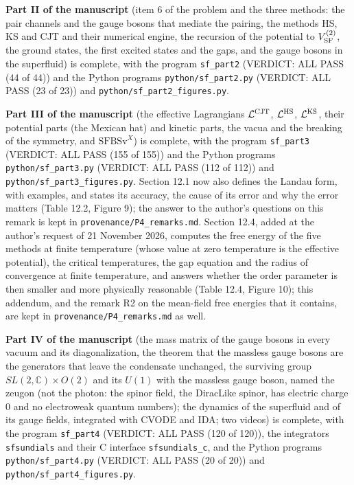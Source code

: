 \documentclass[
  10pt,
]{article}
\begin{document}
\textbf{Part II of the manuscript} (item 6 of the problem and the three
methods: the pair channels and the gauge bosons that mediate the
pairing, the methods HS, KS and CJT and their numerical engine, the
recursion of the potential to \(V^{(2)}_{\rm SF}\), the ground states,
the first excited states and the gaps, and the gauge bosons in the
superfluid) is complete, with the program \texttt{sf\_part2} (VERDICT:
ALL PASS (44 of 44)) and the Python programs
\texttt{python/sf\_part2.py} (VERDICT: ALL PASS (23 of 23)) and
\texttt{python/sf\_part2\_figures.py}.

\textbf{Part III of the manuscript} (the effective Lagrangians
\(\mathcal L^{\rm CJT}\), \(\mathcal L^{\rm HS}\),
\(\mathcal L^{\rm KS}\), their potential parts (the Mexican hat) and
kinetic parts, the vacua and the breaking of the symmetry, and
\(\mathrm{SFBSv}^X\)) is complete, with the program \texttt{sf\_part3}
(VERDICT: ALL PASS (155 of 155)) and the Python programs
\texttt{python/sf\_part3.py} (VERDICT: ALL PASS (112 of 112)) and
\texttt{python/sf\_part3\_figures.py}. Section 12.1 now also defines the
Landau form, with examples, and states its accuracy, the cause of its
error and why the error matters (Table 12.2, Figure 9); the answer to
the author's questions on this remark is kept in
\texttt{provenance/P4\_remarks.md}. Section 12.4, added at the author's
request of 21 November 2026, computes the free energy of the five
methods at finite temperature (whose value at zero temperature is the
effective potential), the critical temperatures, the gap equation and
the radius of convergence at finite temperature, and answers whether the
order parameter is then smaller and more physically reasonable (Table
12.4, Figure 10); this addendum, and the remark R2 on the mean-field
free energies that it contains, are kept in
\texttt{provenance/P4\_remarks.md} as well.

\textbf{Part IV of the manuscript} (the mass matrix of the gauge bosons
in every vacuum and its diagonalization, the theorem that the massless
gauge bosons are the generators that leave the condensate unchanged, the
surviving group \(SL(2,\mathbb C)\times O(2)\) and its \(U(1)\) with the
massless gauge boson, named the zeugon (not the photon: the spinor
field, the DiracLike spinor, has electric charge 0 and no electroweak
quantum numbers); the dynamics of the superfluid and of its gauge
fields, integrated with CVODE and IDA; two videos) is complete, with the
program \texttt{sf\_part4} (VERDICT: ALL PASS (120 of 120)), the
integrators \texttt{sfsundials} and their C interface
\texttt{sfsundials\_c}, and the Python programs
\texttt{python/sf\_part4.py} (VERDICT: ALL PASS (20 of 20)) and
\texttt{python/sf\_part4\_figures.py}.
\end{document}
